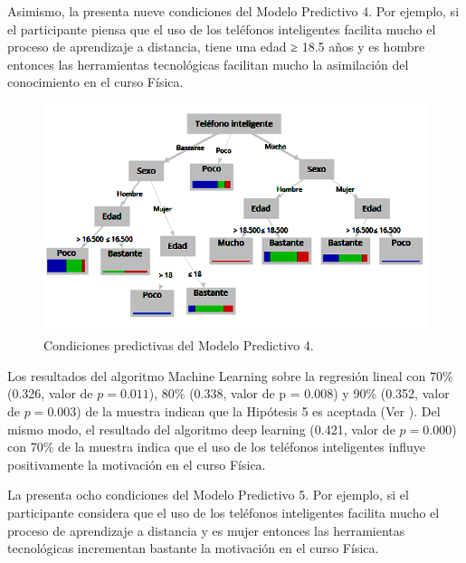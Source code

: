 \documentclass[spanish]{textolivre}
\begin{document}
Asimismo, la  presenta nueve condiciones del Modelo Predictivo 4.  Por ejemplo, si el participante piensa que el uso de los teléfonos inteligentes facilita mucho el proceso de aprendizaje a distancia, tiene una edad ≥ 18.5 años y es hombre entonces las herramientas tecnológicas facilitan mucho la asimilación del conocimiento en el curso Física.

\begin{figure}[htbp]
\centering
\begin{minipage}{.85\textwidth}
 \includegraphics[width=\textwidth]{Image9.png}
 \caption{Condiciones predictivas del Modelo Predictivo 4.}
 \label{fig09}
\end{minipage}
\end{figure}

Los resultados del algoritmo Machine Learning sobre la regresión lineal con 70\% (0.326, valor de $p = 0.011$), 80\% (0.338, valor de p = $0.008$) y 90\% (0.352, valor de $p = 0.003$) de la muestra indican que la Hipótesis 5 es aceptada (Ver ). Del mismo modo, el resultado del algoritmo deep learning (0.421, valor de $p = 0.000$) con 70\% de la muestra indica que el uso de los teléfonos inteligentes influye positivamente la motivación en el curso Física.

La  presenta ocho condiciones del Modelo Predictivo 5. Por ejemplo, si el participante considera que el uso de los teléfonos inteligentes facilita mucho el proceso de aprendizaje a distancia y es mujer entonces las herramientas tecnológicas incrementan bastante la motivación en el curso Física.
\end{document}

